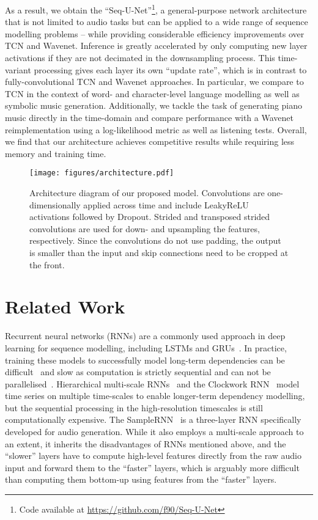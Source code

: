 \documentclass{article}
\begin{document}
As a result, we obtain the ``Seq-U-Net''\footnote{Code available at \mbox{\url{https://github.com/f90/Seq-U-Net}}}, a general-purpose network architecture that is not limited to audio tasks but can be applied to a wide range of sequence modelling problems -- while providing considerable efficiency improvements over TCN and Wavenet.
Inference is greatly accelerated by only computing new layer activations if they are not decimated in the downsampling process.
This time-variant processing gives each layer its own ``update rate'', which is in contrast to fully-convolutional TCN and Wavenet approaches.
In particular, we compare to TCN in the context of word- and character-level language modelling as well as symbolic music generation. 
Additionally, we tackle the task of generating piano music directly in the time-domain and compare performance with a Wavenet reimplementation using a log-likelihood metric as well as listening tests.
Overall, we find that our architecture achieves competitive results while requiring less memory and training time.

\begin{figure}[t]
  \centering
  \centerline{\texttt{[image: figures/architecture.pdf]}}
  \caption{Architecture diagram of our proposed model. Convolutions are one-dimensionally applied across time and include LeakyReLU activations followed by Dropout. Strided and transposed strided convolutions are used for down- and upsampling the features, respectively. Since the convolutions do not use padding, the output is smaller than the input and skip connections need to be cropped at the front.}
  \label{fig:architecture}
\end{figure}

\section{Related Work}

Recurrent neural networks (RNNs) are a commonly used approach in deep learning for sequence modelling, including LSTMs and GRUs~\cite{gravesSpeechRecognition2013,boulanger-lewandowskiModelingTemporal2012}.
In practice, training these models to successfully model long-term dependencies can be difficult~\cite{bengioLearningLongterm1994} and slow as computation is strictly sequential and can not be parallelised~\cite{trinhLearningLongerterm2018}.
Hierarchical multi-scale RNNs~\cite{chungHierarchicalMultiscale2016,elhihiHierarchicalRecurrent1995} and the Clockwork RNN~\cite{koutnikClockworkRNN2014} model time series on multiple time-scales to enable longer-term dependency modelling, but the sequential processing in the high-resolution timescales is still computationally expensive.
The SampleRNN~\cite{mehriSampleRNNUnconditional2016} is a three-layer RNN specifically developed for audio generation.
While it also employs a multi-scale approach to an extent, it inherits the disadvantages of RNNs mentioned above, and the ``slower'' layers have to compute high-level features directly from the raw audio input and forward them to the ``faster'' layers, which is arguably more difficult than computing them bottom-up using features from the ``faster'' layers.
\end{document}
